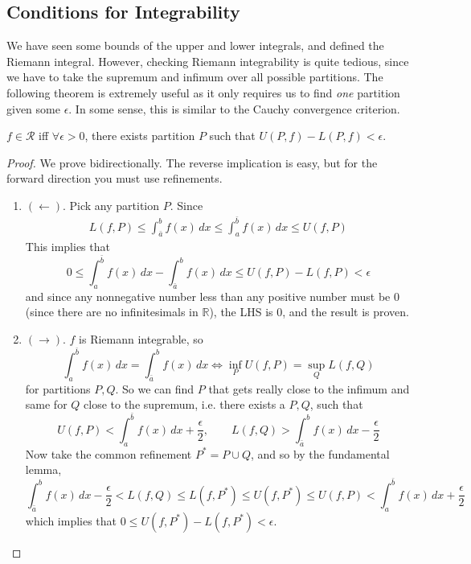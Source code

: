 \subsection{Conditions for Integrability}

  We have seen some bounds of the upper and lower integrals, and defined the Riemann integral. However, checking Riemann integrability is quite tedious, since we have to take the supremum and infimum over all possible partitions. The following theorem is extremely useful as it only requires us to find \textit{one} partition given some $\epsilon$. In some sense, this is similar to the Cauchy convergence criterion. 

  \begin{theorem}[Cauchy]
    $f \in \mathcal{R}$ iff $\forall \epsilon > 0$, there exists partition $P$ such that $U(P, f) - L(P, f) < \epsilon$. 
  \end{theorem}
  \begin{proof}
    We prove bidirectionally. The reverse implication is easy, but for the forward direction you must use refinements. 
    \begin{enumerate}
      \item $(\leftarrow)$. Pick any partition $P$. Since
        \begin{align}
          L(f, P) \leq \int_{\bar{a}}^b f(x) \, dx \leq \int_a^{\bar{b}} f(x)\,dx \leq U(f, P)
        \end{align}
        This implies that 
        \begin{equation}
          0 \leq \int_a^{\bar{b}} f(x)\,dx - \int_{\bar{a}}^b f(x) \, dx \leq U(f, P) - L(f, P) < \epsilon 
        \end{equation}
        and since any nonnegative number less than any positive number must be $0$ (since there are no infinitesimals in $\mathbb{R}$), the LHS is $0$, and the result is proven.  

      \item $(\rightarrow)$. $f$ is Riemann integrable, so  
        \begin{equation}
          \int_a^{\bar{b}} f(x) \,dx = \int_{\bar{a}}^{b} f(x) \,dx \iff \inf_P U(f, P) = \sup_{Q} L(f, Q) 
        \end{equation}
        for partitions $P, Q$. So we can find $P$ that gets really close to the infimum and same for $Q$ close to the supremum, i.e. there exists a $P, Q$, such that
        \begin{equation}
          U(f, P) < \int_a^{\bar{b}} f(x) \,dx + \frac{\epsilon}{2}, \qquad L(f, Q) > \int_{\bar{a}}^b f(x) \,dx - \frac{\epsilon}{2}
        \end{equation}
        Now take the common refinement $P^\ast = P \cup Q$, and so by the fundamental lemma, 
        \begin{equation}
          \int_{\bar{a}}^b f(x) \,dx - \frac{\epsilon}{2} < L(f, Q) \leq L(f, P^\ast) \leq U(f, P^\ast) \leq U(f, P) < \int_a^{\bar{b}} f(x) \,dx + \frac{\epsilon}{2}
        \end{equation} 
        which implies that $0 \leq U(f, P^\ast) - L(f, P^\ast) < \epsilon$. 
    \end{enumerate}
  \end{proof}  

